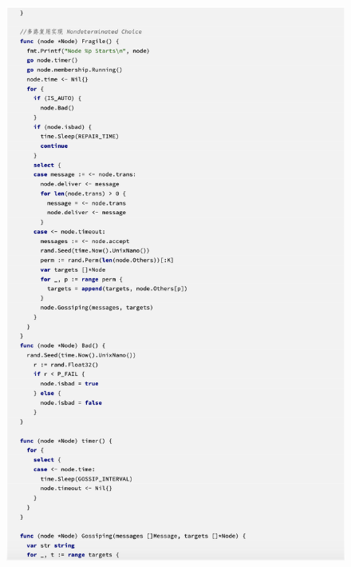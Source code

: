  \begin{figure}[!htbp]
    \small
    \centering
    \includegraphics[width=14cm]{../figures/code/2.png}
 \end{figure}

